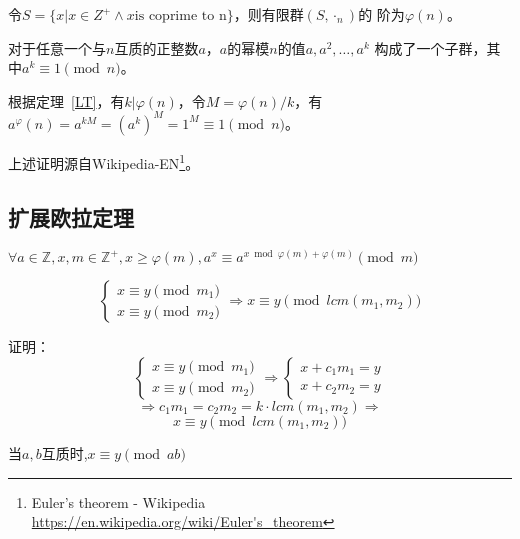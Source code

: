 令$S=\{x|x\in Z^+ \land x \textrm{is coprime to n}\}$，则有限群$(S,\cdot_n)$的
阶为$\varphi(n)$。

对于任意一个与$n$互质的正整数$a$，$a$的幂模$n$的值$a,a^2,\ldots,a^k$
构成了一个子群，其中$a^k\equiv 1 \pmod{n}$。

根据定理~\ref{LT}，有$k|\varphi(n)$，令$M=\varphi(n)/k$，有
$a^\varphi(n)=a^{kM}=(a^k)^M=1^M\equiv 1 \pmod{n}$。

上述证明源自Wikipedia-EN\footnote{Euler's theorem - Wikipedia
	\url{https://en.wikipedia.org/wiki/Euler's_theorem}}。
\subsection{扩展欧拉定理}
\begin{theorem}\label{exEuler}
	$\forall a\in \mathbb{Z},x,m\in \mathbb{Z^+},x\geq \varphi(m)
		,a^x\equiv a^{x \bmod \varphi(m)+\varphi(m)} \pmod{m}$
\end{theorem}

\begin{lemma}\label{EEL1}
	\begin{displaymath}
		\left\{
		\begin{array}{l}
			x\equiv y \pmod{m_1} \\
			x\equiv y \pmod{m_2}
		\end{array}
		\right.
		\Rightarrow x\equiv y \pmod{lcm(m_1,m_2)}
	\end{displaymath}
\end{lemma}

证明：
\begin{displaymath}
	\left\{
	\begin{array}{l}
		x\equiv y \pmod{m_1} \\
		x\equiv y \pmod{m_2}
	\end{array}
	\right.
	\Rightarrow
	\left\{
	\begin{array}{l}
		x+c_1m_1=y \\
		x+c_2m_2=y
	\end{array}
	\right.
\end{displaymath}
\begin{displaymath}
	\Rightarrow
	c_1m_1=c_2m_2=k\cdot lcm(m_1,m_2)
	\Rightarrow
\end{displaymath}
\begin{displaymath}
	x \equiv y \pmod{lcm(m_1,m_2)}
\end{displaymath}

\begin{inference}
	当$a,b$互质时,$x\equiv y \pmod{ab}$
\end{inference}

